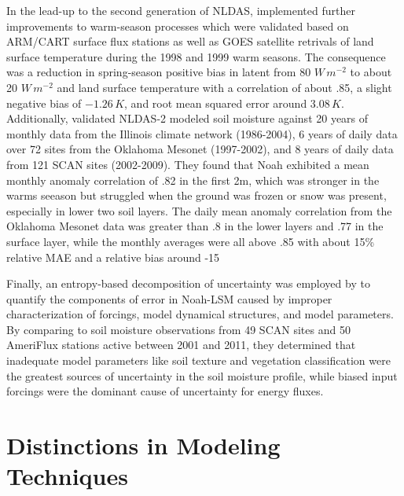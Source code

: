 In the lead-up to the second generation of NLDAS, \citep{wei_improvement_2011} implemented further improvements to warm-season processes which were validated based on ARM/CART surface flux stations as well as GOES satellite retrivals of land surface temperature during the 1998 and 1999 warm seasons. The consequence was a reduction in spring-season positive bias in latent from 80 $W\,m^{-2}$ to about 20 $W\,m^{-2}$ and land surface temperature with a correlation of about .85, a slight negative bias of $-1.26\,K$, and root mean squared error around $3.08\,K$. Additionally, \citep{xia_evaluation_2014} validated NLDAS-2 modeled soil moisture against 20 years of monthly data from the Illinois climate network (1986-2004), 6 years of daily data over 72 sites from the Oklahoma Mesonet (1997-2002), and 8 years of daily data from 121 SCAN sites (2002-2009). They found that Noah exhibited a mean monthly anomaly correlation of .82 in the first 2m, which was stronger in the warms seeason but struggled when the ground was frozen or snow was present, especially in lower two soil layers. The daily mean anomaly correlation from the Oklahoma Mesonet data was greater than .8 in the lower layers and .77 in the surface layer, while the monthly averages were all above .85 with about 15\% relative MAE and a relative bias around -15%

Finally, an entropy-based decomposition of uncertainty was employed by \citep{nearing_benchmarking_2016} to quantify the components of error in Noah-LSM caused by improper characterization of forcings, model dynamical structures, and model parameters. By comparing to soil moisture observations from 49 SCAN sites and 50 AmeriFlux stations active between 2001 and 2011, they determined that inadequate model parameters like soil texture and vegetation classification were the greatest sources of uncertainty in the soil moisture profile, while biased input forcings were the dominant cause of uncertainty for energy fluxes.

\section{Distinctions in Modeling Techniques}

